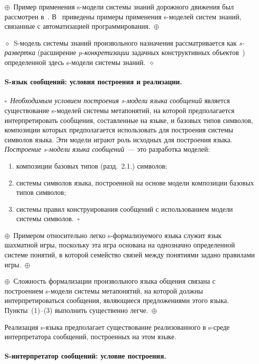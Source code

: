 \begin{multicols}{2}
\noindent
$\oplus$~Пример применения s-модели системы знаний дорожного движения
был рассмотрен в~\cite{1il}. В~\cite{7il} приведены примеры применения
s-моделей систем знаний, связанные с автоматизацией
программирования.~$\oplus$

\noindent
$\diamond$~S-модель системы знаний произвольного назначения
рассматривается как \textit{s-развертка} (расширение \textit{p-конкретизации}
задачных конструктивных объектов~\cite{7il}) определенной здесь s-модели
сис\-те\-мы знаний.~$\diamond$

\paragraph*{S-язык сообщений: условия построения и реализации.}

\noindent $\square$~\textit{Необходимым условием построения s-мо\-де\-ли языка 
сообщений} является существование s-мо\-де\-лей системы метапонятий, на которой 
предполагается интерпретировать сообщения, составленные на языке, и базовых 
типов символов, композиции которых предполагается использовать для построения 
системы символов языка. Эти модели играют роль исходных для построения языка. 
\textit{Построение s-мо\-де\-ли языка сообщений}~--- это разработка моделей:
\begin{enumerate}[(1)]
\item композиции базовых типов (разд.~2.1.) символов;
\item системы символов языка, построенной на основе модели композиции
базовых типов символов;
\item системы правил конструирования сообщений с использованием модели
системы символов.~$\square$
\end{enumerate}

\noindent
$\oplus$~Примером относительно легко s-формализуемого языка служит язык
шахматной игры, поскольку эта игра основана на однозначно определенной
системе понятий, в которой семейство связей между понятиями задано
правилами игры.~$\oplus$

\noindent
$\oplus$~Сложность формализации произвольного языка общения связана с
построением s-модели системы метапонятий, на
которой должны интерпретироваться сообщения, являющиеся предложениями
этого языка. Пункты~(1)--(3) выполнить существенно легче.~$\oplus$

Реализация s-языка предполагает существование реализованного в s-среде
интерпретатора сообщений, построенных на этом языке.

\paragraph*{S-интерпретатор сообщений: условие построения.}


\end{multicols}
